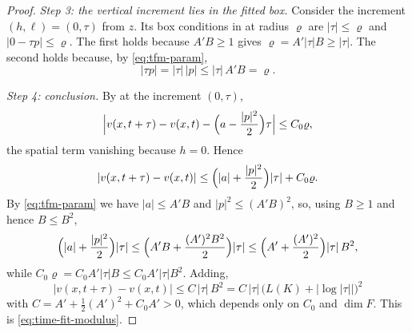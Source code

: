 \begin{proof}
\emph{Step 3: the vertical increment lies in the fitted box.}
Consider the increment $(h,\ell)=(0,\tau)$ from $z$. Its box conditions in
 at radius $\varrho$ are $|\tau|\le\varrho$ and
$|0-\tau p|\le\varrho$. The first holds because $A'B\ge1$ gives
$\varrho=A'|\tau|B\ge|\tau|$. The second holds because, by
\eqref{eq:tfm-param},
\[
  |\tau p|=|\tau|\,|p|\le|\tau|\,A'B=\varrho .
\]

\emph{Step 4: conclusion.}
By  at the increment $(0,\tau)$,
\[
  \Bigl|v(x,t+\tau)-v(x,t)-\Bigl(a-\frac{|p|^2}{2}\Bigr)\tau\Bigr|
   \le C_0\varrho ,
\]
the spatial term vanishing because $h=0$. Hence
\[
  |v(x,t+\tau)-v(x,t)|
   \le\Bigl(|a|+\frac{|p|^2}{2}\Bigr)|\tau|+C_0\varrho .
\]
By \eqref{eq:tfm-param} we have $|a|\le A'B$ and $|p|^2\le(A'B)^2$, so, using
$B\ge1$ and hence $B\le B^2$,
\[
  \Bigl(|a|+\frac{|p|^2}{2}\Bigr)|\tau|
   \le\Bigl(A'B+\frac{(A')^2B^2}{2}\Bigr)|\tau|
   \le\Bigl(A'+\frac{(A')^2}{2}\Bigr)|\tau|\,B^2 ,
\]
while $C_0\varrho=C_0A'|\tau|B\le C_0A'|\tau|B^2$. Adding,
\[
  |v(x,t+\tau)-v(x,t)|\le C\,|\tau|\,B^2
   =C\,|\tau|\,\bigl(L(K)+|\log|\tau||\bigr)^2
\]
with $C=A'+\tfrac12(A')^2+C_0A'>0$, which depends only on $C_0$ and $\dim F$.
This is \eqref{eq:time-fit-modulus}.
\end{proof}
